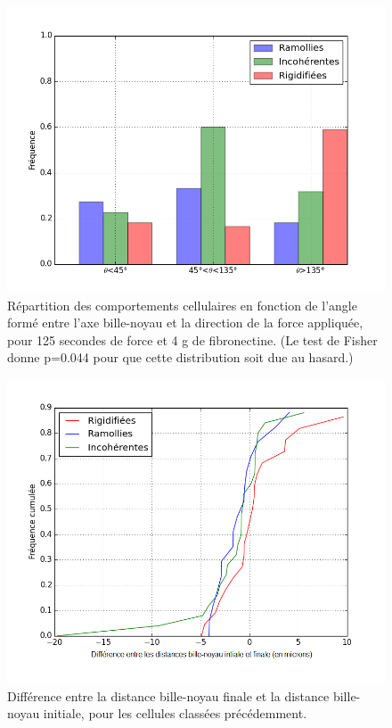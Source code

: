 \begin{figure}[p]
\includegraphics[scale=0.45]{Figures/Hist_Angles.png} 
\caption{Répartition des comportements cellulaires en fonction de l'angle formé entre l'axe bille-noyau et la direction de la force appliquée, pour 125 secondes de force et 4 \micro g de fibronectine. (Le test de Fisher donne p=0.044 pour que cette distribution soit due au hasard.) \label{Angle_C4}}
\end{figure}
\begin{figure}[p]
\includegraphics[scale=0.45]{Figures/Evolution_DBN.png}
\caption{Différence entre la distance bille-noyau finale et la distance bille-noyau initiale, pour les cellules classées précédemment. \label{DBN}}
\end{figure}



